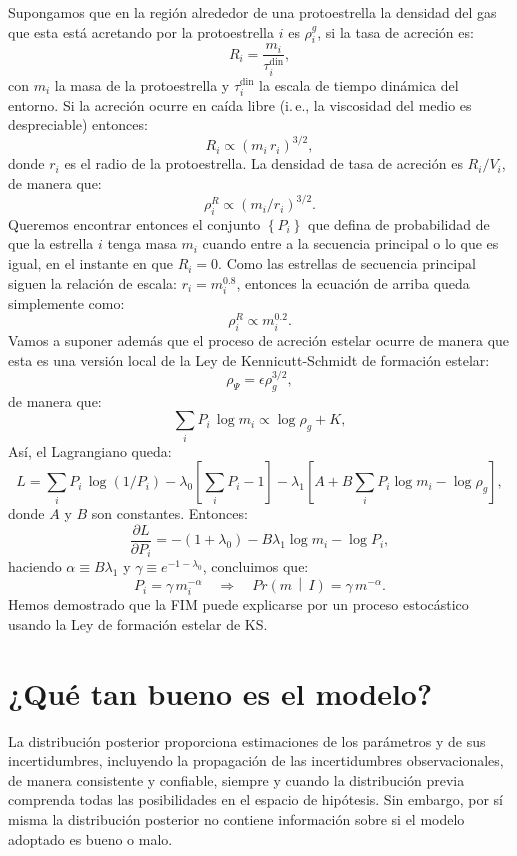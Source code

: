 \documentclass[a4paper,twoside]{article}
\newcommand{\pro}[2]{\ensuremath{Pr\left(#1\,\middle|\, #2\right)}\xspace}
\newcommand{\set}[1]{\ensuremath{\left\{#1\right\}}\xspace}
\begin{document}
Supongamos que en la región alrededor de una protoestrella la densidad del gas que esta está
acretando por la protoestrella $i$ es $\rho^g_i$, si la tasa de acreción es:
%
$$R_i = \frac{m_i}{\tau_i^\text{din}},$$
%
con $m_i$ la masa de la protoestrella y $\tau_i^\text{din}$ la escala de tiempo dinámica del
entorno. Si la acreción ocurre en caída libre (i.\,e., la viscosidad del medio es despreciable)
entonces:
%
$$R_i \propto (m_i\,r_i)^{3/2},$$
%
donde $r_i$ es el radio de la protoestrella. La densidad de tasa de acreción es $R_i/V_i$, de manera
que:
%
$$\rho_i^R \propto (m_i/r_i)^{3/2}.$$
%
Queremos encontrar entonces el conjunto $\set{P_i}$ que defina de probabilidad de que la estrella
$i$ tenga masa $m_i$ cuando entre a la secuencia principal o lo que es igual, en el instante en que
$R_i=0$. Como las estrellas de secuencia principal siguen la relación de escala: $r_i = m_i^{0.8}$,
entonces la ecuación de arriba queda simplemente como:
%
$$\rho_i^R \propto m_i^{0.2}.$$
%
Vamos a suponer además que el proceso de acreción estelar ocurre de manera que esta es una versión
local de la Ley de Kennicutt-Schmidt \citep{Kennicutt1998} de formación estelar:
%
$$\rho_\Psi = \epsilon\rho_g^{3/2},$$
%
de manera que:
%
$$\sum_i P_i\,\log{m_i} \propto \log{\rho_g} + K,$$
%
Así, el Lagrangiano queda:
%
$$L = \sum_i P_i\,\log{(1/P_i)} - \lambda_0\left[\sum_i P_i-1\right] - \lambda_1\left[A+B\sum_i P_i\log{m_i}-\log{\rho_g}\right],$$
%
donde $A$ y $B$ son constantes. Entonces:
%
$$\frac{\partial L}{\partial P_i} = -(1+\lambda_0) - B\lambda_1\log{m_i} - \log{P_i},$$
%
haciendo $\alpha\equiv B\lambda_1$ y $\gamma\equiv e^{-1-\lambda_0}$, concluimos que:
%
$$P_i = \gamma\,m_i^{-\alpha}\quad\Longrightarrow\quad \pro{m}{I} = \gamma\,m^{-\alpha}.$$
%
Hemos demostrado que la FIM puede explicarse por un proceso estocástico usando la Ley de formación
estelar de KS.


\section*{¿Qué tan bueno es el modelo?}

La distribución posterior proporciona estimaciones de los parámetros y de sus incertidumbres,
incluyendo la propagación de las incertidumbres observacionales, de manera consistente y confiable,
siempre y cuando la distribución previa comprenda todas las posibilidades en el espacio de
hipótesis. Sin embargo, por sí misma la distribución posterior no contiene información sobre si el
modelo adoptado es bueno o malo.
\end{document}
